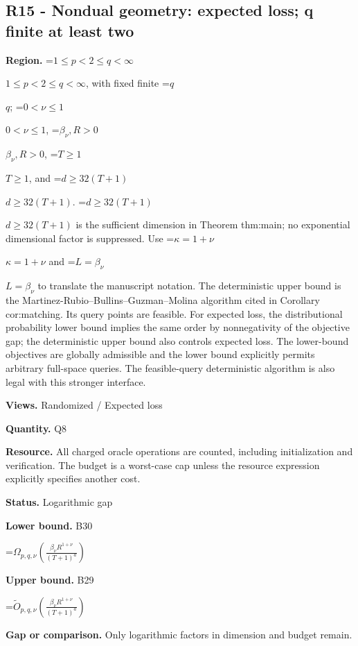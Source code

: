 \documentclass[10pt,a4paper]{article}
\newcommand{\AtlasMath}[1]{\par\begingroup\centering\setbox0=\hbox{$\displaystyle #1$}\ifdim\wd0>1.4\linewidth\typeout{ATLAS WIDE FORMULA: \the\wd0}\fi\ifdim\wd0>\linewidth\resizebox{\linewidth}{!}{\box0}\else\box0\fi\par\endgroup}
\newcommand{\AtlasInlineMath}[1]{\begingroup\setbox0=\hbox{$#1$}\ifdim\wd0>.4\linewidth\endgroup\AtlasMath{#1}\else\endgroup$#1$\fi}
\begin{document}
\subsection{R15 - Nondual geometry: expected loss; q finite at least two}


\textbf{Region.} \AtlasInlineMath{1\le p<2\le q<\infty}, with fixed finite \AtlasInlineMath{q}; \AtlasInlineMath{0<\nu\le1}, \AtlasInlineMath{\beta_\nu,R>0}, \AtlasInlineMath{T\ge1}, and \AtlasInlineMath{d\ge32(T+1)}. \AtlasInlineMath{d\ge32(T+1)} is the sufficient dimension in Theorem thm:main; no exponential dimensional factor is suppressed. Use \AtlasInlineMath{\kappa=1+\nu} and \AtlasInlineMath{L=\beta_\nu} to translate the manuscript notation. The deterministic upper bound is the Martinez-Rubio--Bullins--Guzman--Molina algorithm cited in Corollary cor:matching. Its query points are feasible. For expected loss, the distributional probability lower bound implies the same order by nonnegativity of the objective gap; the deterministic upper bound also controls expected loss. The lower-bound objectives are globally admissible and the lower bound explicitly permits arbitrary full-space queries. The feasible-query deterministic algorithm is also legal with this stronger interface.



\textbf{Views.} Randomized / Expected loss



\textbf{Quantity.} Q8



\textbf{Resource.} All charged oracle operations are counted, including initialization and verification. The budget is a worst-case cap unless the resource expression explicitly specifies another cost.



\textbf{Status.} Logarithmic gap



\textbf{Lower bound.} B30



\AtlasMath{\Omega_{p,q,\nu}\!\left(\frac{\beta_\nu R^{1+\nu}}{(T+1)^a}\right)}


\textbf{Upper bound.} B29



\AtlasMath{\widetilde O_{p,q,\nu}\!\left(\frac{\beta_\nu R^{1+\nu}}{(T+1)^a}\right)}


\textbf{Gap or comparison.} Only logarithmic factors in dimension and budget remain.
\end{document}

